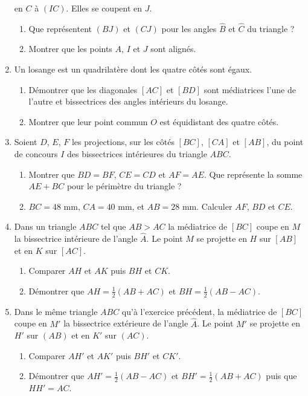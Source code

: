 \documentclass[12 pt]{report}
\theoremstyle{plain}
\newcounter{n}
\begin{document}
\begin{enumerate}
en $C$ à $(IC)$. Elles se coupent en $J$. \begin{enumerate}
\item Que représentent $(BJ)$ et $(CJ)$ pour les angles $\widehat{B}$ et $\widehat{C}$ du triangle ?
\item Montrer que les points $A$, $I$ et $J$ sont alignés.
\end{enumerate}
\item Un losange est un quadrilatère dont les quatre côtés sont égaux.\begin{enumerate}
\item Démontrer que les diagonales $[AC]$ et $[BD]$ sont médiatrices l'une de l'autre et bissectrices des angles intérieurs du losange. 
\item Montrer que leur point commun $O$ est équidistant des quatre côtés. 
\end{enumerate}
\item Soient $D$, $E$, $F$ les projections, sur les côtés $[BC]$, $[CA]$ et $[AB]$,
du point de concours $I$ des bissectrices intérieures du triangle $ABC$.
\begin{enumerate}
\item Montrer que $BD=BF$, $CE=CD$ et $AF=AE$. Que représente la somme $AE+BC$ pour le périmètre du triangle ? 
\item $BC= 48$ mm, $CA=40$ mm, et $AB=28$ mm. Calculer $AF$, $BD$ et $CE$.
\end{enumerate}
\item Dans un triangle $ABC$ tel que $AB>AC$ la médiatrice de $[BC]$ coupe en $M$
la bissectrice intérieure de l'angle $\widehat{A}$. Le point $M$ se projette en 
$H$ sur $[AB]$ et en $K$ sur $[AC]$. 
\begin{enumerate}
\item Comparer $AH$ et $AK$ puis $BH$ et $CK$. 
\item Démontrer que $AH=\frac12(AB+AC)$ et $BH=\frac12(AB-AC)$.
\end{enumerate}
\item Dans le même triangle $ABC$ qu'à l'exercice précédent, la médiatrice de $[BC]$ 
coupe en $M'$ la bissectrice extérieure de l'angle $\widehat{A}$. Le point $M'$ se projette en $H'$ sur $(AB)$ et en $K'$ sur $(AC)$. \begin{enumerate}
\item Comparer $AH'$ et $AK'$ puis $BH'$ et $CK'$.
\item Démontrer que $AH'=\frac12(AB-AC)$ et $BH'=\frac12(AB+AC)$ puis que $HH'=AC$. 
\end{enumerate}

\end{enumerate}
\end{document}
